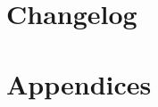 \documentclass[
  10pt,
  twocolumn,
  twoside,
]{article}
\begin{document}

\begin{infobox}[Keywords]
  \centering
  
 \smallskip
\end{infobox}

\renewcommand{\baselinestretch}{1}
\selectfont

\twocolumn

\restoregeometry

\clearpage

\tableofcontents

\clearpage








\section*{Changelog}



\clearpage






\onecolumn

\appendix
\section{Appendices}

\setcounter{page}{1}
\renewcommand{\thepage}{A\arabic{page}}
\renewcommand{\thefigure}{A\arabic{figure}}
\renewcommand{\thetable}{A\arabic{table}}
\setcounter{figure}{0}
\setcounter{table}{0}

\renewcommand{\thesection}{A\arabic{section}}
\setcounter{section}{0}


\end{document}
